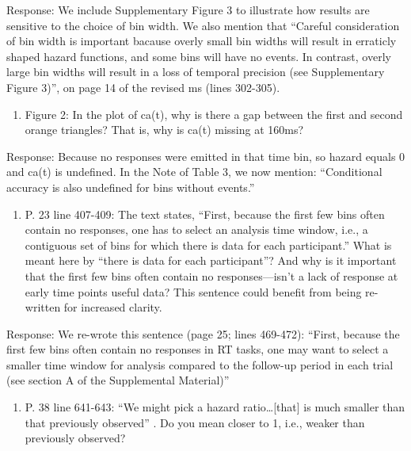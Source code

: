 \documentclass[
]{article}
\providecommand{\tightlist}{%
  \setlength{\itemsep}{0pt}\setlength{\parskip}{0pt}}
\renewenvironment{quote}{\begin{leftbar}}{\end{leftbar}}
\begin{document}
Response: We include Supplementary Figure 3 to illustrate how results
are sensitive to the choice of bin width. We also mention that ``Careful
consideration of bin width is important bacause overly small bin widths
will result in erraticly shaped hazard functions, and some bins will
have no events. In contrast, overly large bin widths will result in a
loss of temporal precision (see Supplementary Figure 3)'', on page 14 of
the revised ms (lines 302-305).

\begin{quote}
\begin{enumerate}
\def\labelenumi{\arabic{enumi}.}
\setcounter{enumi}{2}
\tightlist
\item
  Figure 2: In the plot of ca(t), why is there a gap between the first
  and second orange triangles? That is, why is ca(t) missing at 160ms?
\end{enumerate}
\end{quote}

Response: Because no responses were emitted in that time bin, so hazard
equals 0 and ca(t) is undefined. In the Note of Table 3, we now mention:
``Conditional accuracy is also undefined for bins without events.''

\begin{quote}
\begin{enumerate}
\def\labelenumi{\arabic{enumi}.}
\setcounter{enumi}{3}
\tightlist
\item
  P. 23 line 407-409: The text states, ``First, because the first few
  bins often contain no responses, one has to select an analysis time
  window, i.e., a contiguous set of bins for which there is data for
  each participant.'' What is meant here by ``there is data for each
  participant''? And why is it important that the first few bins often
  contain no responses---isn't a lack of response at early time points
  useful data? This sentence could benefit from being re-written for
  increased clarity.
\end{enumerate}
\end{quote}

Response: We re-wrote this sentence (page 25; lines 469-472): ``First,
because the first few bins often contain no responses in RT tasks, one
may want to select a smaller time window for analysis compared to the
follow-up period in each trial (see section A of the Supplemental
Material)''

\begin{quote}
\begin{enumerate}
\def\labelenumi{\arabic{enumi}.}
\setcounter{enumi}{4}
\tightlist
\item
  P. 38 line 641-643: ``We might pick a hazard ratio\ldots{[}that{]} is
  much smaller than that previously observed'' . Do you mean closer to
  1, i.e., weaker than previously observed?
\end{enumerate}
\end{quote}
\end{document}
